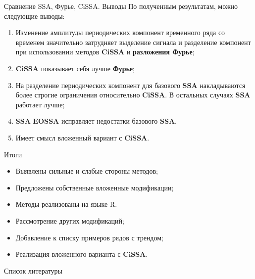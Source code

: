 \documentclass[notheorems, handout]{beamer}
\newcommand{\SSA}{\textbf{SSA}}
\newcommand{\EOSSA}{\textbf{EOSSA}}
\newcommand{\CISSA}{\textbf{CiSSA}}
\begin{document}
	
	\begin{frame}{Сравнение SSA, Фурье, CiSSA. Выводы}
		По полученным результатам, можно следующие выводы: 
		\begin{enumerate}
			\item Изменение амплитуды периодических компонент временного ряда со временем значительно затрудняет выделение сигнала и разделение компонент при использовании методов 
			$\CISSA$ и \textbf{разложения Фурье};
			\item $\CISSA$ показывает себя лучше \textbf{Фурье};
			\item На разделение периодических компонент для базового $\SSA$ накладываются более строгие ограничения относительно $\CISSA$. В остальных случаях $\SSA$ работает лучше;
			\item $\SSA$ $\EOSSA$ исправляет недостатки базового $\SSA$.
			\item Имеет смысл вложенный вариант с $\CISSA$.
		\end{enumerate}

		
	\end{frame}
	

	\begin{frame}{Итоги}
		\textbf{}
		\begin{itemize}
			\item Выявлены сильные и слабые стороны методов;
			\item Предложены собственные вложенные модификации;
			\item Методы реализованы на языке R.
		\end{itemize}

		\textbf{}
		\begin{itemize}
			\item Рассмотрение других модификаций;
			\item Добавление к списку примеров рядов с трендом;
			\item Реализация вложенного варианта с $\CISSA$.
		\end{itemize}
	\end{frame}
	
	
	\begin{frame}[allowframebreaks]{Список литературы}
		\printbibliography
	\end{frame}

	
\end{document}
